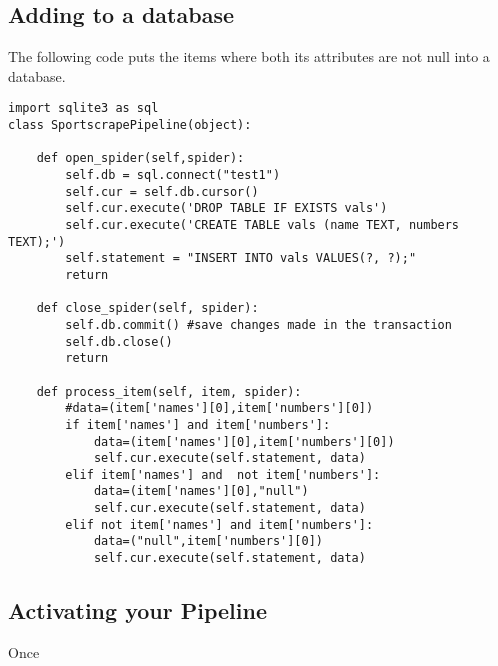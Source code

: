 \subsection*{Adding to a database}
The following code puts the items where both its attributes are not null into a database. 
\begin{lstlisting}
import sqlite3 as sql
class SportscrapePipeline(object):
	
	def open_spider(self,spider):
		self.db = sql.connect("test1")
		self.cur = self.db.cursor()
		self.cur.execute('DROP TABLE IF EXISTS vals')
		self.cur.execute('CREATE TABLE vals (name TEXT, numbers TEXT);')
		self.statement = "INSERT INTO vals VALUES(?, ?);"
		return

	def close_spider(self, spider):
		self.db.commit() #save changes made in the transaction
		self.db.close()
		return

	def process_item(self, item, spider):
		#data=(item['names'][0],item['numbers'][0])
		if item['names'] and item['numbers']:
			data=(item['names'][0],item['numbers'][0])
			self.cur.execute(self.statement, data)
		elif item['names'] and  not item['numbers']:
			data=(item['names'][0],"null")
			self.cur.execute(self.statement, data)
		elif not item['names'] and item['numbers']:
			data=("null",item['numbers'][0])
			self.cur.execute(self.statement, data)
\end{lstlisting}

\subsection*{Activating your Pipeline}
Once 